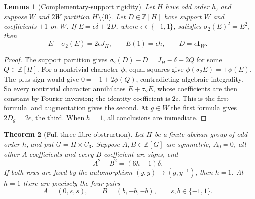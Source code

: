 \documentclass[11pt]{article}
\newtheorem{theorem}{Theorem}[section]
\newtheorem{lemma}[theorem]{Lemma}
\theoremstyle{definition}
\theoremstyle{remark}
\begin{document}
\begin{lemma}[Complementary-support rigidity]
\label{se-lem-support}
Let $H$ have odd order $h$, and suppose $W$ and $2W$ partition
$H\setminus\{0\}$.  Let $D\in\mathbb Z[H]$ have support $W$ and
coefficients $\pm1$ on $W$.  If
$E=\epsilon\delta+2D$, where $\epsilon\in\{-1,1\}$, satisfies
$\sigma_2(E)^2=E^2$, then
\[
 E+\sigma_2(E)=2\epsilon J_H,
 \qquad E(1)=\epsilon h,
 \qquad D=\epsilon\mathbf1_W.
\]
\end{lemma}

\begin{proof}
The support partition gives
$\sigma_2(D)-D=J_H-\delta+2Q$ for some $Q\in\mathbb Z[H]$.
For a nontrivial character $\phi$, equal squares give
$\phi(\sigma_2 E)=\pm\phi(E)$.  The plus sign would give
$0=-1+2\phi(Q)$, contradicting algebraic integrality.  So every
nontrivial character annihilates $E+\sigma_2 E$, whose coefficients are
then constant by Fourier inversion; the identity coefficient is
$2\epsilon$.  This is the first formula, and augmentation gives the
second.  At $g\in W$ the first formula gives $2D_g=2\epsilon$, the
third.  When $h=1$, all conclusions are immediate.
\end{proof}

\begin{theorem}[Full three-fibre obstruction]
\label{se-thm-three}
Let $H$ be a finite abelian group of odd order $h$, and put
$G=H\times C_3$.  Suppose $A,B\in\mathbb Z[G]$ are symmetric,
$A_0=0$, all other $A$ coefficients and every $B$ coefficient are signs,
and
\[
 A^2+B^2=(6h-1)\delta.
\]
If both rows are fixed by the automorphism $(g,y)\mapsto(g,y^{-1})$,
then $h=1$.  At $h=1$ there are precisely the four pairs
\[
 A=(0,s,s),\qquad B=(b,-b,-b),\qquad s,b\in\{-1,1\}.
\]
\end{theorem}
\end{document}
